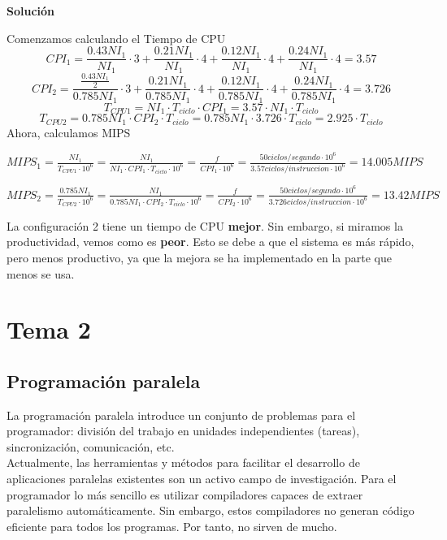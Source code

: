 \documentclass[12pt,spanish]{article}
\newenvironment{solution}{
	\par
	\textbf{Solución}
	\par
	\begin{center}
}
{
	\end{center}
}
\begin{document}
\begin{enumerate}
\begin{solution}
Comenzamos calculando el Tiempo de CPU
\[
CPI_1=\frac{0.43NI_1}{NI_1}\cdot 3 + \frac{0.21NI_1}{NI_1}\cdot 4 + \frac{0.12NI_1}{NI_1}\cdot 4 + \frac{0.24NI_1}{NI_1}\cdot 4 =3.57
\]
\[
CPI_2=\frac{\frac{0.43NI_1}{2}}{0.785NI_1}\cdot 3 + \frac{0.21NI_1}{0.785NI_1}\cdot 4 + \frac{0.12NI_1}{0.785NI_1}\cdot 4 + \frac{0.24NI_1}{0.785NI_1}\cdot 4 =3.726
\]
\[T_{CPU1}=NI_1 \cdot T_{ciclo} \cdot CPI_1=3.57 \cdot NI_1 \cdot T_{ciclo}
\]
\[T_{CPU2}=0.785NI_1  \cdot CPI_2 \cdot T_{ciclo}=0.785NI_1 \cdot 3.726 \cdot T_{ciclo}=2.925 \cdot T_{ciclo}
\]
Ahora, calculamos MIPS
\begin{adjustbox}{width=\textwidth,totalheight=\textheight,keepaspectratio}
$MIPS_1=\frac{NI_1}{T_{CPU1} \cdot 10^6}=\frac{NI_1}{NI_1 \cdot CPI_1 \cdot T_{ciclo} \cdot 10^6}=\frac{f}{CPI_1 \cdot 10^6}=\frac{50 ciclos/segundo \cdot 10^6}{3.57 ciclos/instruccion \cdot 10^6}=14.005 MIPS
$
\end{adjustbox}
\begin{adjustbox}{width=\textwidth,totalheight=\textheight,keepaspectratio}
$MIPS_2=\frac{0.785NI_1}{T_{CPU2} \cdot 10^6}=\frac{NI_1}{0.785NI_1 \cdot CPI_2 \cdot T_{ciclo} \cdot 10^6}=\frac{f}{CPI_2 \cdot 10^6}=\frac{50 ciclos/segundo \cdot 10^6}{3.726 ciclos/instruccion \cdot 10^6}=13.42 MIPS
$
\end{adjustbox}
\par
La configuración 2 tiene un tiempo de CPU \textbf{mejor}. Sin embargo, si miramos la productividad, vemos como es \textbf{peor}. Esto se debe a que el sistema es más rápido, pero menos productivo, ya que la mejora se ha implementado en la parte que menos se usa.
\end{solution}
\end{enumerate}

\section{Tema 2}

\subsection{Programación paralela}

La programación paralela introduce un conjunto de problemas para el programador: división del trabajo en unidades independientes (tareas), sincronización, comunicación, etc.\\

Actualmente, las herramientas y métodos para facilitar el desarrollo de aplicaciones paralelas existentes son un activo campo de investigación. Para el programador lo más sencillo es utilizar compiladores capaces de extraer paralelismo automáticamente. Sin embargo, estos compiladores no generan código eficiente para todos los programas. Por tanto, no sirven de mucho.\\
\end{document}
